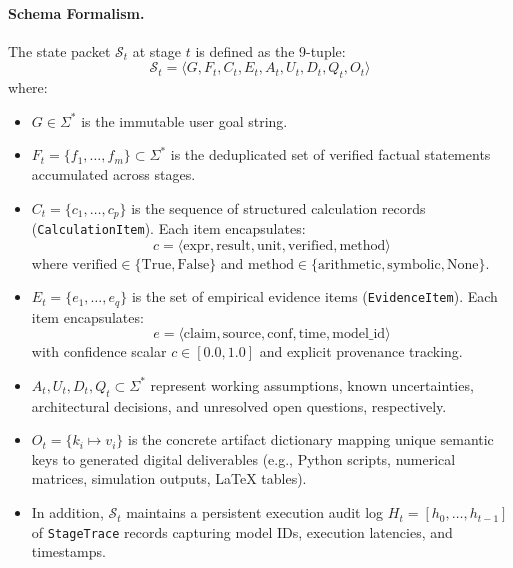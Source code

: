 \paragraph{Schema Formalism.}
The state packet $\mathcal{S}_t$ at stage $t$ is defined as the 9-tuple:
\begin{equation}
\mathcal{S}_t = \langle G, F_t, C_t, E_t, A_t, U_t, D_t, Q_t, O_t \rangle
\end{equation}
where:
\begin{itemize}
    \item $G \in \Sigma^*$ is the immutable user goal string.
    \item $F_t = \{f_1, \dots, f_m\} \subset \Sigma^*$ is the deduplicated set of verified factual statements accumulated across stages.
    \item $C_t = \{c_1, \dots, c_p\}$ is the sequence of structured calculation records (\texttt{CalculationItem}). Each item encapsulates:
    \begin{equation}
    c = \langle \text{expr}, \text{result}, \text{unit}, \text{verified}, \text{method} \rangle
    \end{equation}
    where $\text{verified} \in \{\text{True}, \text{False}\}$ and $\text{method} \in \{\text{arithmetic}, \text{symbolic}, \text{None}\}$.
    \item $E_t = \{e_1, \dots, e_q\}$ is the set of empirical evidence items (\texttt{EvidenceItem}). Each item encapsulates:
    \begin{equation}
    e = \langle \text{claim}, \text{source}, \text{conf}, \text{time}, \text{model\_id} \rangle
    \end{equation}
    with confidence scalar $c \in [0.0, 1.0]$ and explicit provenance tracking.
    \item $A_t, U_t, D_t, Q_t \subset \Sigma^*$ represent working assumptions, known uncertainties, architectural decisions, and unresolved open questions, respectively.
    \item $O_t = \{k_i \mapsto v_i\}$ is the concrete artifact dictionary mapping unique semantic keys to generated digital deliverables (e.g., Python scripts, numerical matrices, simulation outputs, LaTeX tables).
    \item In addition, $\mathcal{S}_t$ maintains a persistent execution audit log $H_t = [h_0, \dots, h_{t-1}]$ of \texttt{StageTrace} records capturing model IDs, execution latencies, and timestamps.
\end{itemize}

